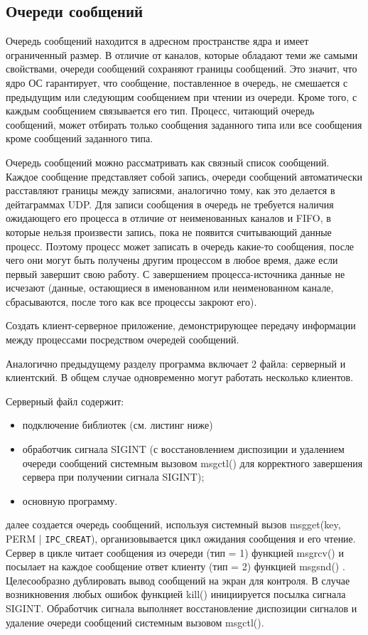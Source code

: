 \documentclass[a4paper]{article}
\begin{document}
\subsection{Очереди сообщений}
	Очередь сообщений находится в адресном пространстве ядра и имеет ограниченный размер. В отличие от каналов, которые обладают теми же самыми свойствами, очереди сообщений сохраняют границы сообщений. Это значит, что ядро ОС гарантирует, что сообщение, поставленное в очередь, не смешается с предыдущим или следующим сообщением при чтении из очереди. Кроме того, с каждым сообщением связывается его тип. Процесс, читающий очередь сообщений, может отбирать только сообщения заданного типа или все сообщения кроме сообщений заданного типа.
	
	Очередь сообщений можно рассматривать как связный список сообщений. Каждое сообщение представляет собой запись, очереди сообщений автоматически расставляют границы между записями, аналогично тому, как это делается в дейтаграммах UDP. Для записи сообщения в очередь не требуется наличия ожидающего его процесса в отличие от неименованных каналов и FIFO, в которые нельзя произвести запись, пока не появится считывающий данные процесс. Поэтому процесс может записать в очередь какие-то сообщения, после чего они могут быть получены другим процессом в любое время, даже если первый завершит свою работу. С завершением процесса-источника данные не исчезают (данные, остающиеся в именованном или неименованном канале, сбрасываются, после того как все процессы закроют его).
	
	Создать клиент-серверное приложение, демонстрирующее передачу информации между процессами посредством очередей сообщений.

	Аналогично предыдущему разделу программа включает 2 файла: серверный и клиентский. В общем случае одновременно могут работать несколько клиентов.
	
	Серверный файл содержит:
	\begin{itemize}
	\item подключение библиотек (см. листинг ниже)
	\item обработчик сигнала SIGINT (с восстановлением диспозиции и удалением очереди сообщений системным вызовом msgctl() для корректного завершения сервера при получении сигнала SIGINT);
	\item основную программу.
	\end{itemize}
далее создается очередь сообщений, используя системный вызов msgget(key, PERM | \texttt{IPC\_CREAT}), организовывается цикл ожидания сообщения и его чтение. Сервер в цикле читает сообщения из очереди (тип = 1) функцией msgrcv() и посылает на каждое сообщение ответ клиенту (тип = 2) функцией msgsnd() . Целесообразно дублировать вывод сообщений на экран для контроля. В случае возникновения любых ошибок функцией kill() инициируется посылка сигнала SIGINT. Обработчик сигнала выполняет восстановление диспозиции сигналов и удаление очереди сообщений системным вызовом msgctl().
\end{document}
